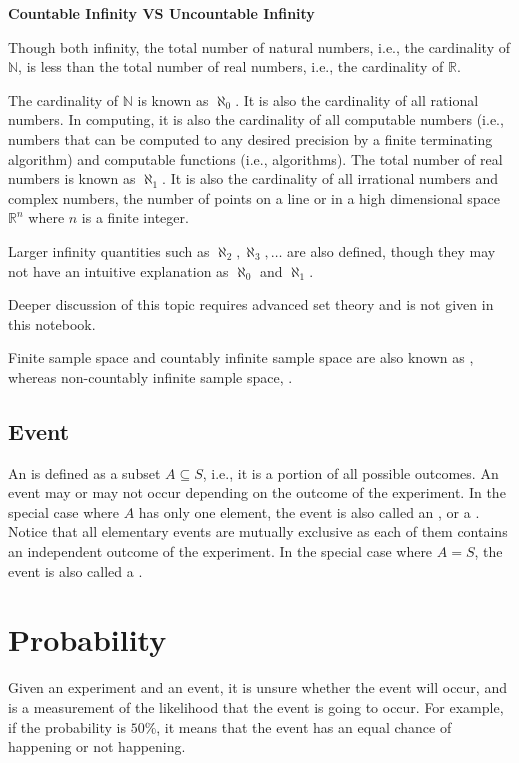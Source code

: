 \begin{mdframed}
\noindent \textbf{Countable Infinity VS Uncountable Infinity}

Though both infinity, the total number of natural numbers, i.e., the cardinality of $\mathbb{N}$, is less than the total number of real numbers, i.e., the cardinality of $\mathbb{R}$.

The cardinality of $\mathbb{N}$ is known as $\aleph_0$. It is also the cardinality of all rational numbers. In computing, it is also the cardinality of all computable numbers (i.e., numbers that can be computed to any desired precision by a finite terminating algorithm) and computable functions (i.e., algorithms). The total number of real numbers is known as $\aleph_1$. It is also the cardinality of all irrational numbers and complex numbers, the number of points on a line or in a high dimensional space $\mathbb{R}^n$ where $n$ is a finite integer.

Larger infinity quantities such as $\aleph_2, \aleph_3, \ldots$ are also defined, though they may not have an intuitive explanation as $\aleph_0$ and $\aleph_1$.

Deeper discussion of this topic requires advanced set theory and is not given in this notebook.
\end{mdframed}

Finite sample space and countably infinite sample space are also known as , whereas non-countably infinite sample space, .

\subsection{Event}

An  is defined as a subset $A \subseteq S$, i.e., it is a portion of all possible outcomes. An event may or may not occur depending on the outcome of the experiment. In the special case where $A$ has only one element, the event is also called an , or a . Notice that all elementary events are mutually exclusive as each of them contains an independent outcome of the experiment. In the special case where $A=S$, the event is also called a .

\section{Probability}

Given an experiment and an event, it is unsure whether the event will occur, and  is a measurement of the likelihood that the event is going to occur. For example, if the probability is $50\%$, it means that the event has an equal chance of happening or not happening.


